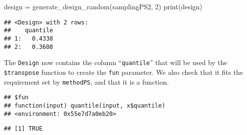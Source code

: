 \documentclass[
]{scrbook}
\newenvironment{Shaded}{\begin{snugshade}}{\end{snugshade}}
\newcommand{\DecValTok}[1]{\textcolor[rgb]{0.00,0.00,0.81}{#1}}
\newcommand{\FunctionTok}[1]{\textcolor[rgb]{0.00,0.00,0.00}{#1}}
\newcommand{\NormalTok}[1]{#1}
\newcommand{\OtherTok}[1]{\textcolor[rgb]{0.56,0.35,0.01}{#1}}
\newcommand{\SpecialCharTok}[1]{\textcolor[rgb]{0.00,0.00,0.00}{#1}}
\renewenvironment{Shaded} {\begin{snugshade}\small} {\end{snugshade}}
\begin{document}
\begin{Shaded}
\begin{Highlighting}[]
\NormalTok{design }\OtherTok{=} \FunctionTok{generate\_design\_random}\NormalTok{(samplingPS2, }\DecValTok{2}\NormalTok{)}
\FunctionTok{print}\NormalTok{(design)}
\end{Highlighting}
\end{Shaded}

\begin{verbatim}
## <Design> with 2 rows:
##    quantile
## 1:   0.4338
## 2:   0.3608
\end{verbatim}

The \texttt{Design} now contains the column ``\texttt{quantile}'' that will be used by the \texttt{\$transpose} function to create the \texttt{fun} parameter.
We also check that it fits the requirement set by \texttt{methodPS}, and that it is a function.

\begin{Shaded}
\end{Shaded}

\begin{verbatim}
## $fun
## function(input) quantile(input, x$quantile)
## <environment: 0x55e7d7a0eb20>
\end{verbatim}

\begin{Shaded}
\end{Shaded}

\begin{verbatim}
## [1] TRUE
\end{verbatim}

\begin{Shaded}
\end{Shaded}
\end{document}
